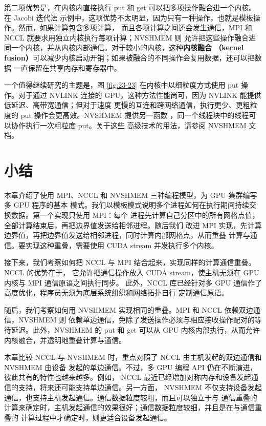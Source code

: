 第二项优势是，在内核内直接执行 put 和 get 可以把多项操作融合进一个内核。在 Jacobi 迭代法
示例中，这项优势不太明显，因为只有一种操作，也就是模板操作。然而，如果计算包含多项计算，
而且各项计算之间还会发生通信，MPI 和 NCCL 就要求用独立内核执行每项计算；NVSHMEM 则
允许把这些操作融合进同一个内核，并从内核内部通信。对于较小的内核，这种\textbf{内核融合
（kernel fusion）}可以减少内核启动开销；如果被融合的不同操作会复用数据，还可以把数据
一直保留在共享内存和寄存器中。

一个值得继续研究的主题是，图 \ref{fig:23-23} 在内核中以细粒度方式使用 put 操作。对于通过
NVLINK 连接的 GPU，这种方法性能尚可，因为 NVLINK 能提供低延迟、高带宽通信；但对于速度
更慢的互连和跨网络通信，执行更少、更粗粒度的 put 操作会更高效。NVSHMEM 提供另一函数
，同一个线程块中的线程可以协作执行一次粗粒度 put。关于这些
高级技术的用法，请参阅 NVSHMEM 文档\cite{ch23-nvshmem}。

\section{小结}
\label{sec:multi-gpu-summary}

本章介绍了使用 MPI、NCCL 和 NVSHMEM 三种编程模型，为 GPU 集群编写多 GPU 程序的基本
模式。我们以模板模式说明多个进程如何在执行期间持续交换数据。第一个实现只使用 MPI：每个
进程先计算自己分区中的所有网格点值，全部计算结束后，再把边界值发送给相邻进程。随后我们
改进 MPI 实现，先计算边界值，再把边界值发送给相邻进程，同时计算内部网格点，从而重叠
计算与通信。要实现这种重叠，需要使用 CUDA stream 并发执行多个内核。

接下来，我们考察如何把 NCCL 与 MPI 结合起来，实现同样的计算通信重叠。NCCL 的优势在于，
它允许把通信操作放入 CUDA stream，使主机无须在 GPU 内核与 MPI 通信原语之间执行同步。
此外，NCCL 库已经针对多 GPU 通信作了高度优化，程序员无须为底层系统组织和网络拓扑自行
定制通信原语。

随后，我们考察如何用 NVSHMEM 实现相同的重叠。MPI 和 NCCL 依赖双边通信，NVSHMEM 则
依赖单边通信，免除了发送操作必须与相应接收操作配对的等待延迟。此外，NVSHMEM 的 put 和
get 可以从 GPU 内核内部执行，从而允许内核融合，并透明地重叠计算与通信。

本章比较 NCCL 与 NVSHMEM 时，重点对照了 NCCL 由主机发起的双边通信和 NVSHMEM 由设备
发起的单边通信。不过，多 GPU 编程 API 仍在不断演进，彼此共有的特性也越来越多。例如，
NCCL 最近已经增加对称内存和设备发起通信的支持，将来还可能支持单边通信。另一方面，
NVSHMEM 不仅支持设备发起通信，也支持主机发起通信。通信数据粒度较粗，而且可以独立于与
通信重叠的计算来确定时，主机发起通信的效果很好；通信数据粒度较细，并且是在与通信重叠的
计算过程中才确定时，则更适合设备发起通信。

